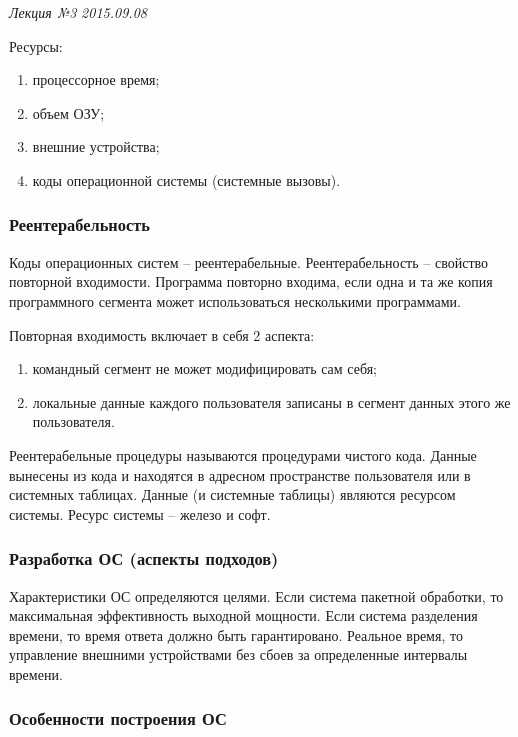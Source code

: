 \clearpage
\begin{flushright}
	\textit{Лекция №3}
	\textit{2015.09.08}
\end{flushright}

Ресурсы:
\begin{enumerate}
	\item процессорное время;
	\item объем ОЗУ;
	\item внешние устройства;
	\item коды операционной системы (системные вызовы).
\end{enumerate}

\subsubsection{Реентерабельность}
Коды операционных систем – реентерабельные. Реентерабельность – свойство повторной входимости.  Программа повторно входима, если одна и та же копия программного сегмента может использоваться несколькими программами. 

Повторная входимость включает в себя 2 аспекта:
\begin{enumerate}
	\item командный сегмент не может модифицировать сам себя;
	\item локальные данные каждого пользователя записаны в сегмент данных этого же пользователя.
\end{enumerate}

Реентерабельные процедуры называются процедурами чистого кода.  Данные вынесены из кода и находятся в адресном пространстве  пользователя или в системных таблицах. Данные (и системные таблицы) являются ресурсом системы. Ресурс системы – железо и софт.

\subsubsection{Разработка ОС (аспекты подходов)}
Характеристики ОС определяются целями. Если система пакетной обработки, то максимальная эффективность выходной мощности. Если система разделения времени, то время ответа должно быть гарантировано. Реальное время, то управление внешними устройствами без сбоев за определенные интервалы времени.

\subsubsection{Особенности построения ОС}

